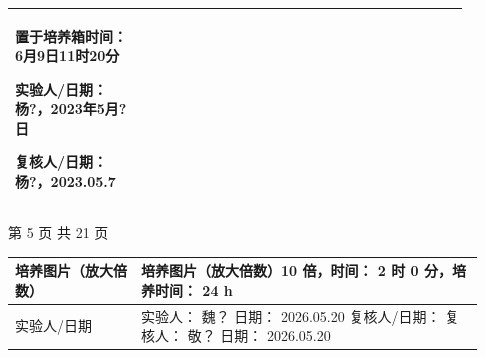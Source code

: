 \documentclass[UTF8,10pt,a4paper,fontset=fandol]{ctexart}
\newcommand{\fieldvalue}[1]{#1}
\newcommand{\handwritten}[1]{#1}
\begin{document}
\begin{center}
\begin{tabular}{|p{0.25\linewidth}|p{0.38\linewidth}|p{0.27\linewidth}|}
\begin{minipage}[t]{0.35\linewidth}
置于培养箱时间： 
\fieldvalue{\handwritten{6月9日11时20分}}

实验人/日期：
\fieldvalue{\handwritten{杨?，2023年5月?日}}

复核人/日期：
\fieldvalue{\handwritten{杨?，2023.05.7}}
\end{minipage}
&
\\
\hline
\end{tabular}
\end{center}

\begin{center}
第 5 页 共 21 页
\end{center}

\newpage

\begin{center}
\begin{tabular}{|p{0.25\linewidth}|p{0.68\linewidth}|}
\hline
培养图片（放大倍数） &
培养图片（放大倍数）\fieldvalue{\handwritten{10}} 倍，时间：
\fieldvalue{\handwritten{2}} 时
\fieldvalue{\handwritten{0}} 分，培养时间：
\fieldvalue{\handwritten{24}} h
\\
\hline
实验人/日期 &
实验人：
\fieldvalue{\handwritten{魏？}}
\quad 日期：
\fieldvalue{\handwritten{2026.05.20}}
\quad
复核人/日期：
复核人：
\fieldvalue{\handwritten{敬？}}
\quad 日期：
\fieldvalue{\handwritten{2026.05.20}}
\\
\hline
\end{tabular}
\end{center}
\end{document}
